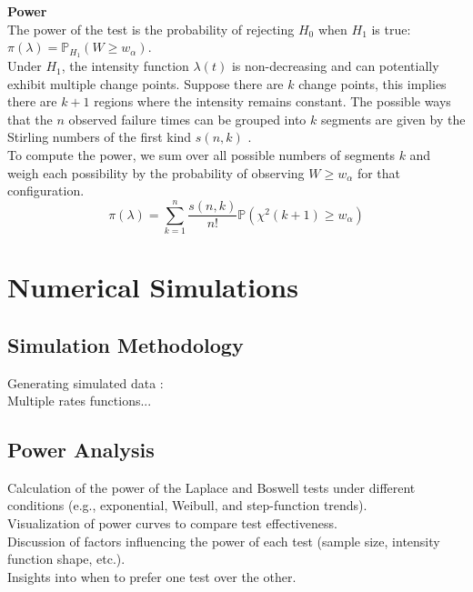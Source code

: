 \documentclass{journalstyle}
\begin{document}
\noindent\textbf{Power} \\
The power of the test is the probability of rejecting $H_0$ when $H_1$ is true: \\
$\pi(\lambda) = \mathbb{P}_{H_1}(W \geq w_{\alpha})$. \\
Under $H_1$, the intensity function $\lambda(t)$ is non-decreasing and can potentially exhibit multiple change points.
Suppose there are $k$ change points, this implies there are $k + 1$ regions where the intensity remains constant.
The possible ways that the $n$ observed failure times can be grouped into $k$ segments are given by the Stirling numbers of the first kind $s(n, k)$ \cite{StirlingNumbers}. \\
To compute the power, we sum over all possible numbers of segments $k$ and weigh each possibility by the probability of observing $W \geq w_{\alpha}$ for that configuration.
\begin{equation}
    \pi(\lambda) = \sum_{k=1}^{n} \frac{s(n, k)}{n!} \mathbb{P}(\chi^2(k+1) \geq w_{\alpha})
    \label{eq:boswell_power}
\end{equation}




\section{Numerical Simulations}

\subsection{Simulation Methodology}

Generating simulated data : \\
Multiple rates functions...

\subsection{Power Analysis}
Calculation of the power of the Laplace and Boswell tests under different conditions (e.g., exponential, Weibull, and step-function trends). \\

Visualization of power curves to compare test effectiveness. \\

Discussion of factors influencing the power of each test (sample size, intensity function shape, etc.). \\

Insights into when to prefer one test over the other.
\end{document}
